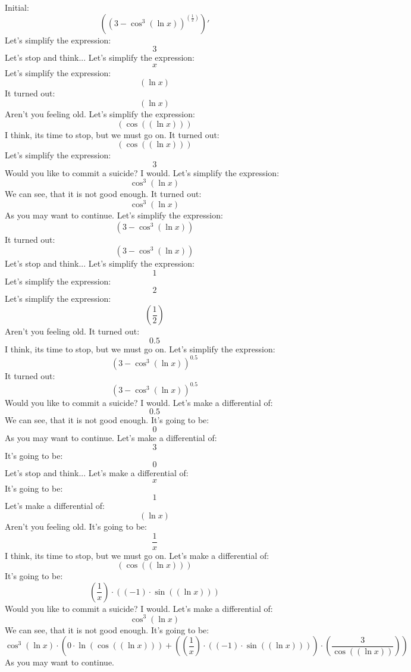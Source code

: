 \documentclass[12pt,a4paper]{scrartcl}
\begin{document}
            $$
$$Initial:$$ \left( \left( 3- \cos^{3}  \left(  \ln x \right)  \right) ^{ \left(  \frac{1}{2} \right) } \right)'$$  
Let's simplify the expression: $$3$$ Let's stop and think... 
Let's simplify the expression: $$x$$  
Let's simplify the expression: $$ \left(  \ln x \right) $$  
It turned out: $$ \left(  \ln x \right) $$ Aren't you feeling old. 
Let's simplify the expression: $$ \left(  \cos  \left(  \left(  \ln x \right)  \right)  \right) $$ I think, its time to stop, but we must go on. 
It turned out: $$ \left(  \cos  \left(  \left(  \ln x \right)  \right)  \right) $$  
Let's simplify the expression: $$3$$ Would you like to commit a suicide? I would. 
Let's simplify the expression: $$ \cos^{3}  \left(  \ln x \right) $$ We can see, that it is not good enough. 
It turned out: $$ \cos^{3}  \left(  \ln x \right) $$ As you may want to continue. 
Let's simplify the expression: $$ \left( 3- \cos^{3}  \left(  \ln x \right)  \right) $$  
It turned out: $$ \left( 3- \cos^{3}  \left(  \ln x \right)  \right) $$ Let's stop and think... 
Let's simplify the expression: $$1$$  
Let's simplify the expression: $$2$$  
Let's simplify the expression: $$ \left(  \frac{1}{2} \right) $$ Aren't you feeling old. 
It turned out: $$0.5$$ I think, its time to stop, but we must go on. 
Let's simplify the expression: $$ \left( 3- \cos^{3}  \left(  \ln x \right)  \right) ^{0.5} $$  
It turned out: $$ \left( 3- \cos^{3}  \left(  \ln x \right)  \right) ^{0.5} $$ Would you like to commit a suicide? I would. 
Let's make a differential of: $$0.5$$ We can see, that it is not good enough. 
It's going to be: $$0$$ As you may want to continue. 
Let's make a differential of: $$3$$  
It's going to be: $$0$$ Let's stop and think... 
Let's make a differential of: $$x$$  
It's going to be: $$1$$  
Let's make a differential of: $$ \left(  \ln x \right) $$ Aren't you feeling old. 
It's going to be: $$ \frac{1}{x}$$ I think, its time to stop, but we must go on. 
Let's make a differential of: $$ \left(  \cos  \left(  \left(  \ln x \right)  \right)  \right) $$  
It's going to be: $$ \left(  \frac{1}{x} \right)  \cdot  \left(  \left( -1 \right)  \cdot  \sin  \left(  \left(  \ln x \right)  \right)  \right) $$ Would you like to commit a suicide? I would. 
Let's make a differential of: $$ \cos^{3}  \left(  \ln x \right) $$ We can see, that it is not good enough. 
It's going to be: $$ \cos^{3}  \left(  \ln x \right)  \cdot  \left( 0 \cdot  \ln  \left(  \cos  \left(  \left(  \ln x \right)  \right)  \right) + \left(  \left(  \frac{1}{x} \right)  \cdot  \left(  \left( -1 \right)  \cdot  \sin  \left(  \left(  \ln x \right)  \right)  \right)  \right)  \cdot  \left(  \frac{3}{ \cos  \left(  \left(  \ln x \right)  \right) } \right)  \right) $$ As you may want to continue. 
\end{document}
